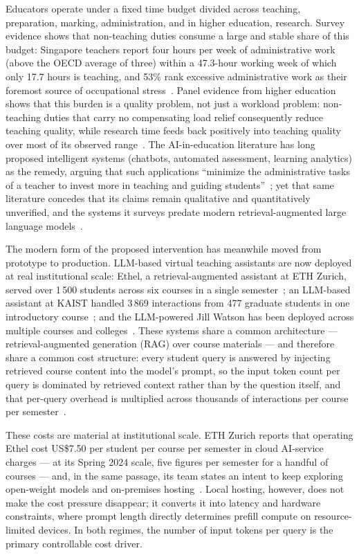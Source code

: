 Educators operate under a fixed time budget divided across teaching,
preparation, marking, administration, and in higher education, research.
Survey evidence shows that non-teaching duties consume a large and
stable share of this budget: Singapore teachers report four hours per week of
administrative work (above the OECD average of three) within a 47.3-hour
working week of which only 17.7 hours is teaching, and 53\% rank excessive
administrative work as their foremost source of occupational
stress~\cite{oecd25:TalisSG}. Panel evidence from higher education shows that
this burden is a quality problem, not just a workload problem: non-teaching
duties that carry no compensating load relief consequently reduce teaching
quality, while research time feeds back positively into teaching quality over
most of its observed range~\cite{apec15:GarciaGallego}. The AI-in-education
literature has long proposed intelligent systems (chatbots, automated
assessment, learning analytics) as the remedy, arguing that such
applications \enquote{minimize the administrative tasks of a teacher to
invest more in teaching and guiding students}~\cite{sust22:Ahmad}; yet that
same literature concedes that its claims remain qualitative and
quantitatively unverified, and the systems it surveys predate modern
retrieval-augmented large language models~\cite{sust22:Ahmad,
ijethe19:ZawackiRichter}.

The modern form of the proposed intervention has meanwhile moved from
prototype to production. LLM-based virtual teaching assistants are now
deployed at real institutional scale: Ethel, a retrieval-augmented assistant
at ETH Zurich, served over 1\,500 students across six courses in a single
semester~\cite{tpt24:Kortemeyer}; an LLM-based assistant at KAIST handled
3\,869 interactions from 477 graduate students in one introductory
course~\cite{acl25:Kweon}; and the LLM-powered Jill Watson has been deployed
across multiple courses and colleges~\cite{arxiv24:JillWatson}. These
systems share a common architecture --- retrieval-augmented generation (RAG)
over course materials --- and therefore share a common cost structure: every
student query is answered by injecting retrieved course content into the
model's prompt, so the input token count per query is dominated by retrieved
context rather than by the question itself, and that per-query overhead is
multiplied across thousands of interactions per course per
semester~\cite{femnlp23:Liu, acl25:Kweon}.

These costs are material at institutional scale. ETH Zurich reports that
operating Ethel cost US\$7.50 per student per course per semester in cloud
AI-service charges --- at its Spring 2024 scale, five figures per semester for
a handful of courses --- and, in the same passage, its team states an intent to
keep exploring open-weight models and on-premises
hosting~\cite{tpt24:Kortemeyer}. Local hosting, however, does not make the
cost pressure disappear; it converts it into latency and hardware constraints,
where prompt length directly determines prefill compute on resource-limited
devices. In both regimes, the number of input tokens per query is the primary
controllable cost driver.

